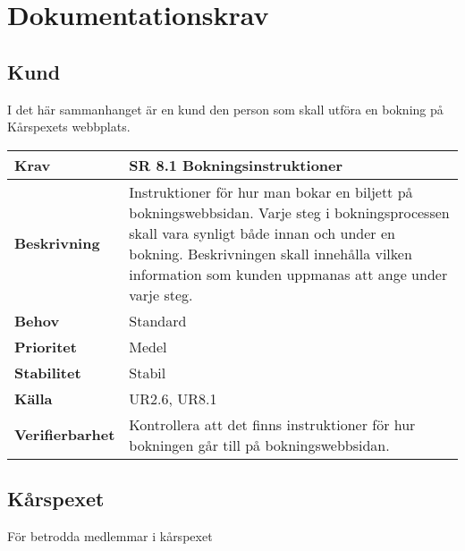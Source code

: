 \documentclass[a4paper, twoside, 11pt, titlepage]{article}
\begin{document}
\clearpage
\section{Dokumentationskrav}



	\subsection{Kund}


	I det här sammanhanget är en kund den person som skall utföra en bokning på Kårspexets webbplats.

	\begin{tabular} { p{2.6cm} p{12.5cm} }
		\hline
		\sffamily\textbf{Krav} & \sffamily\textbf{SR 8.1 Bokningsinstruktioner } \\
		\hline
		\sffamily\textbf{Beskrivning} & Instruktioner för hur man bokar en biljett på bokningswebbsidan. Varje steg i bokningsprocessen skall vara synligt både innan och under en bokning. Beskrivningen skall innehålla vilken information som kunden uppmanas att ange under varje steg.  \\
		\hline
		\sffamily\textbf{Behov} & Standard  \\
		\hline
		\sffamily\textbf{Prioritet} & Medel  \\
		\hline
		\sffamily\textbf{Stabilitet} & Stabil  \\
		\hline
		\sffamily\textbf{Källa} & UR2.6, UR8.1  \\
		\hline
		\sffamily\textbf{Verifierbarhet} & Kontrollera att det finns instruktioner för hur bokningen går till på bokningswebbsidan.  \\
		\hline
	\end{tabular}


	\subsection{Kårspexet}


	För betrodda medlemmar i kårspexet
\end{document}
